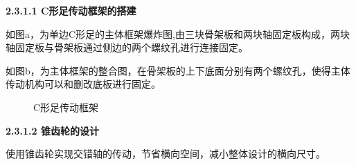 \documentclass[12pt]{article}
\begin{document}
\begin{CJK}{UTF8}{gbsn}
\textbf{2.3.1.1 C形足传动框架的搭建}\par
 如图a，为单边C形足的主体框架爆炸图,由三块骨架板和两块轴固定板构成，两块轴固定板与骨架板通过侧边的两个螺纹孔进行连接固定。\par
如图b，为主体框架的整合图，在骨架板的上下底面分别有两个螺纹孔，使得主体传动机构可以和删改底板进行固定。
\begin{figure}[H]
{}
\quad
{}
\quad
\caption{C形足传动框架}
\end{figure}
\textbf{2.3.1.2 锥齿轮的设计}\par
 使用锥齿轮实现交错轴的传动，节省横向空间，减小整体设计的横向尺寸。
 \begin{figure}[H]
{}
\quad

\end{figure}
\end{CJK}
\end{document}
